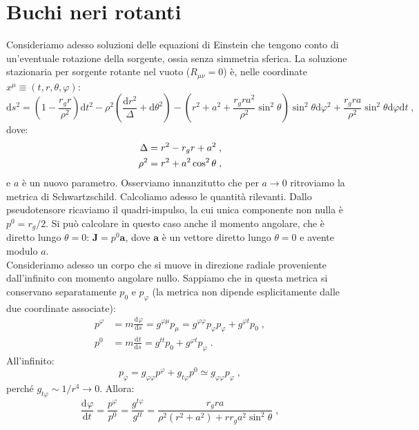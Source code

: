 \documentclass[12pt,a4paper]{report}
\theoremstyle{definition}
\newcommand{\dev}[3][]{\frac{\mathrm{d}^{#1} #2}{\mathrm{d} #3^{#1}}}
\newcommand{\diff}[1][]{\mathrm{d}#1}
\begin{document}
\section{Buchi neri rotanti}
Consideriamo adesso soluzioni delle equazioni di Einstein che tengono conto di un'eventuale rotazione della sorgente, ossia senza simmetria sferica. La soluzione stazionaria per sorgente rotante nel vuoto ($R_{\mu\nu}=0$) è, nelle coordinate $x^{\mu}\equiv (t,r,\theta,\varphi)$:
\begin{equation}
\diff{s}^2=\left(1-\frac{r_gr}{\rho^2}\right)\diff{t}^2-\rho^2\left(\frac{\diff{r}^2}{\Delta}+\diff{\theta}^2\right)-\left(r^2+a^2+\frac{r_gra^2}{\rho^2}\sin^2\theta\right)\sin^2\theta\diff{\varphi}^2+\frac{r_gra}{\rho^2}\sin^2\theta\diff{\varphi}\diff{t}\;,
\end{equation}
dove:
\begin{align}
\Delta &= r^2-r_gr+a^2 \notag\;, \\
\rho^2 &= r^2+a^2\cos^2\theta\;,
\end{align}
e $a$ è un nuovo parametro. Osserviamo innanzitutto che per $a\to 0$ ritroviamo la metrica di Schwartzschild. Calcoliamo adesso le quantità rilevanti. Dallo pseudotensore ricaviamo il quadri-impulso, la cui unica componente non nulla è $p^0=r_g/2$. Si può calcolare in questo caso anche il momento angolare, che è diretto lungo $\theta=0$: $\mathbf{J}=p^0\mathbf{a}$, dove $\mathbf{a}$ è un vettore diretto lungo $\theta=0$ e avente modulo $a$. \\
Consideriamo adesso un corpo che si muove in direzione radiale proveniente dall'infinito con momento angolare nullo. Sappiamo che in questa metrica si conservano separatamente $p_0$ e $p_{\varphi}$ (la metrica non dipende esplicitamente dalle due coordinate associate):
\begin{align*}
p^{\varphi} &= m\dev{\varphi}{s}=g^{\varphi\mu}p_{\mu}=g^{\varphi\varphi}p_{\varphi}p_{\varphi}+g^{\varphi t}p_0\;, \\
p^0 &= m\dev{t}{s}=g^{tt}p_0+g^{\varphi t}p_{\varphi}\;.
\end{align*}
All'infinito:
\begin{equation}
p_{\varphi}=g_{\varphi\varphi}p^{\varphi}+g_{t\varphi}p^0\simeq g_{\varphi\varphi}p_{\varphi}\;,
\end{equation}
perché $g_{t\varphi}\sim 1/r^4\to 0$. Allora:
\begin{equation}
\dev{\varphi}{t}=\frac{p^{\varphi}}{p^0}=\frac{g^{t\varphi}}{g^{tt}}=\frac{r_gra}{\rho^2(r^2+a^2)+rr_ga^2\sin^2\theta}\;,
\end{equation}
\end{document}
